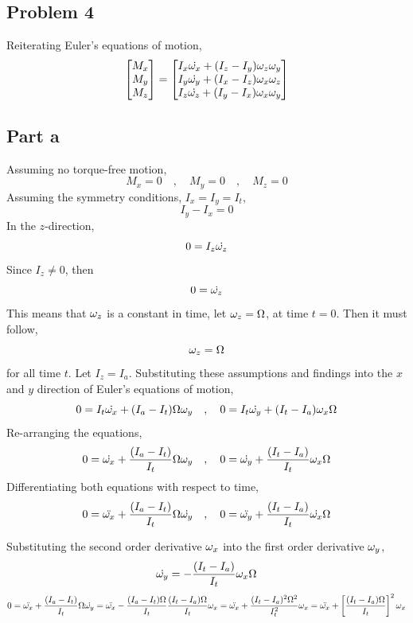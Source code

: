 \documentclass[a4paper, 12pt]{report}
\begin{document}
\begin{center}
\section{Problem 4}

Reiterating Euler's equations of motion,
$$\begin{bmatrix}M_x \\ M_y \\ M_z\end{bmatrix} = \begin{bmatrix} 
I_{x}\dot{\omega_x} + (I_{z} - I_{y})\omega_z\omega_y\\
I_{y}\dot{\omega_y} + (I_{x} - I_{z})\omega_x\omega_z\\
I_{z}\dot{\omega_z} + (I_{y} - I_{x})\omega_x\omega_y
\end{bmatrix}$$
\subsection{Part a}
Assuming no torque-free motion,
$$M_x = 0 \quad,\quad M_y = 0 \quad,\quad M_z = 0$$
Assuming the symmetry conditions, $I_x = I_y = I_t$,
$$I_{y} - I_{x} = 0$$
In the $z$-direction,
$$0 = I_{z}\dot{\omega_z}$$
Since $I_z\neq 0$, then
$$0 = \dot{\omega_z}$$
This means that $\omega_z$ is a constant in time, let $\omega_z = \Omega$, at time $t=0$. Then it must follow,
$$\omega_z = \Omega$$
for all time $t$. Let $I_z = I_a$. Substituting these assumptions and findings into the $x$ and $y$ direction of Euler's equations of motion,
$$0 = I_{t}\dot{\omega_x} + (I_{a} - I_{t})\Omega\omega_y \quad,\quad 0 = I_{t}\dot{\omega_y} + (I_{t} - I_{a})\omega_x\Omega$$
Re-arranging the equations,
$$0 = \dot{\omega_x} + \frac{(I_{a} - I_{t})}{I_{t}}\Omega\omega_y \quad,\quad 0 = \dot{\omega_y} + \frac{(I_{t} - I_{a})}{I_{t}}\omega_x\Omega$$
Differentiating both equations with respect to time,
$$0 = \ddot{\omega_x} + \frac{(I_{a} - I_{t})}{I_{t}}\Omega\dot{\omega_y} \quad,\quad 0 = \ddot{\omega_y} + \frac{(I_{t} - I_{a})}{I_{t}}\dot{\omega_x}\Omega$$

Substituting the second order derivative $\omega_x$ into the first order derivative $\omega_y$,
$$\dot{\omega_y} = -\frac{(I_{t} - I_{a})}{I_{t}}\omega_x\Omega$$
$$0 = \ddot{\omega_x} + \frac{(I_{a} - I_{t})}{I_{t}}\Omega\dot{\omega_y} = \ddot{\omega_x} - \frac{(I_{a} - I_{t})\Omega}{I_{t}}\frac{(I_{t} - I_{a})\Omega}{I_{t}}\omega_x = \ddot{\omega_x} + \frac{(I_{t}-I_{a})^2\Omega^2}{I_{t}^2}\omega_x = \ddot{\omega_x} + \left[\frac{(I_{t}-I_{a})\Omega}{I_{t}}\right]^2\omega_x$$


\end{center}
\end{document}
